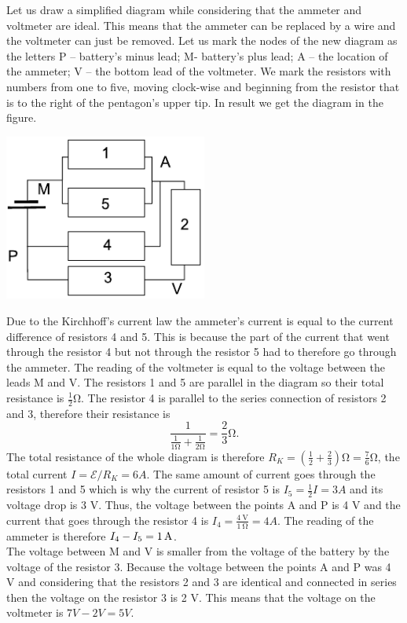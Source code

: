 \solueng
Let us draw a simplified diagram while considering that the ammeter and voltmeter are ideal. This means that the ammeter can be replaced by a wire and the voltmeter can just be removed. Let us mark the nodes of the new diagram as the letters P – battery’s minus lead; M- battery’s plus lead; A – the location of the ammeter; V – the bottom lead of the voltmeter. We mark the resistors with numbers from one to five, moving clock-wise and beginning from the resistor that is to the right of the pentagon’s upper tip. In result we get the diagram in the figure.
\begin{center}
	\includegraphics[width=0.5\textwidth]{2017-v3g-06-viisnurk-lah}
\end{center}
Due to the Kirchhoff’s current law the ammeter’s current is equal to the current difference of resistors 4 and 5. This is because the part of the current that went through the resistor 4 but not through the resistor 5 had to therefore go through the ammeter. The reading of the voltmeter is equal to the voltage between the leads M and V. The resistors 1 and 5 are parallel in the diagram so their total resistance is $\frac{1}{2}\si{\ohm}$. The resistor 4 is parallel to the series connection of resistors 2 and 3, therefore their resistance is
$$\frac{1}{\frac{1}{1\si{\ohm}}+\frac{1}{2\si{\ohm}}} = \frac 23 \si{\ohm}. $$ 
The total resistance of the whole diagram is therefore $R_K=\left(\frac 12 + 
\frac 23\right)\si{\ohm}=\frac 76\si{\ohm}$, the total current $I=\mathcal 
E/R_K=\SI{6}A$. The same amount of current goes through the resistors 1 and 5 which is why the current of resistor 5 is $I_5=\frac 12 I=\SI{3}A$ and its voltage drop is 3 V. Thus, the voltage between the points A and P is 4 V and the current that goes through the resistor 4 is $I_4=\frac{\SI{4}{\volt}}{\SI{1}{\ohm}}=\SI{4}A$. The reading of the ammeter is therefore $I_4-I_5=\SI 1A$.\\
The voltage between M and V is smaller from the voltage of the battery by the voltage of the resistor 3. Because the voltage between the points A and P was 4 V and considering that the resistors 2 and 3 are identical and connected in series then the voltage on the resistor 3 is 2 V. This means that the voltage on the voltmeter is $\SI{7}V -\SI{2}V= \SI{5}V$.
\probend